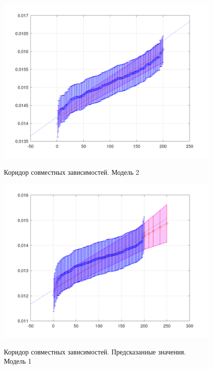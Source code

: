\begin{figure}[H]
	\begin{center}
		\includegraphics[scale=0.32]{joint_depth_2}
		\label{pic:joint_depth2}
		\caption{Коридор совместных зависимостей. Модель 2}
	\end{center}
\end{figure}

\begin{figure}[H]
	\begin{center}
		\includegraphics[scale=0.32]{prediction_1}
		\label{pic:prediction1}
		\caption{Коридор совместных зависимостей. Предсказанные значения. Модель 1}
	\end{center}
\end{figure}


